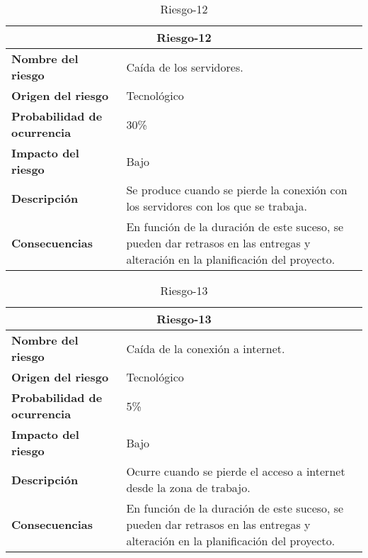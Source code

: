 \begin{table}[H]
\begin{center}
\begin{tabular}{p{} p{7cm}}
\multicolumn{2}{c}{\textbf{Riesgo-12} } \\
\hline \hline
\textbf{Nombre del riesgo} &  Caída de los servidores.\\
\hline
\textbf{Origen del riesgo} & Tecnológico\\
\hline
\textbf{Probabilidad de ocurrencia} &  30\% \\
\hline
\textbf{Impacto del riesgo} &  Bajo \\
\hline
\textbf{Descripción} & Se produce cuando se pierde la conexión con los servidores con los que se trabaja.  \\
\hline
\textbf{Consecuencias} &  En función de la duración de este suceso, se pueden dar retrasos en las entregas y alteración en la planificación del proyecto. \\
\hline
\end{tabular}
\caption{Riesgo-12}
\label{tab:Riesgo-12}
\end{center}
\end{table}

\begin{table}[H]
\begin{center}
\begin{tabular}{p{} p{7cm}}
\multicolumn{2}{c}{\textbf{Riesgo-13} } \\
\hline \hline
\textbf{Nombre del riesgo} &  Caída de la conexión a internet.\\
\hline
\textbf{Origen del riesgo} & Tecnológico\\
\hline
\textbf{Probabilidad de ocurrencia} &  5\% \\
\hline
\textbf{Impacto del riesgo} &  Bajo \\
\hline
\textbf{Descripción} &  Ocurre cuando se pierde el acceso a internet desde la zona de trabajo. \\
\hline
\textbf{Consecuencias} &  En función de la duración de este suceso, se pueden dar retrasos en las entregas y alteración en la planificación del proyecto. \\
\hline
\end{tabular}
\caption{Riesgo-13}
\label{tab:Riesgo-13}
\end{center}
\end{table}

